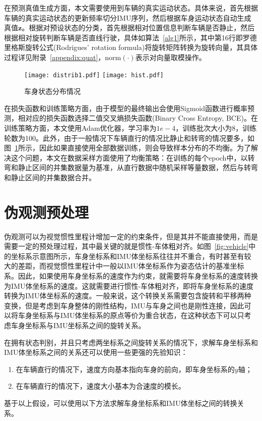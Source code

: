 在预测真值生成方面，本文需要使用到车辆的真实运动状态。具体来说，首先根据车辆的真实运动状态的更新频率切分IMU序列，然后根据车身运动状态自动生成真值$\symbf{z}$。根据对预设状态的分类，首先根据相对位置信息判断车辆是否静止，然后根据相对旋转判断车辆是否直线行驶，具体如算法~\ref{alg1}所示，其中第16行即罗德里格斯旋转公式(Rodrigues' rotation formula)\cite{dai2015euler}将旋转矩阵转换为旋转向量，其具体过程详见附录~\ref{appendix:quat}，$\text{norm}(\cdot)$表示对向量取模操作。

\begin{figure}
  \centering
  \texttt{[image: distrib1.pdf]}
  \texttt{[image: hist.pdf]}
  \caption{车身状态分布情况}
  \label{fig:data_distrib}
\end{figure}

在损失函数和训练策略方面，由于模型的最终输出会使用Sigmoid函数进行概率预测，相对应的损失函数选择二值交叉熵损失函数(Binary Cross Entropy, BCE)。在训练策略方面，本文使用Adam优化器\cite{kingma2014adam}，学习率为$1e-4$，训练批次大小为8，训练轮数为100。此外，由于一般情况下车辆直行的情况比静止和转弯的情况要多，如图~\ref{fig:data_distrib}所示，因此如果直接使用全部数据训练，则会导致样本分布的不均衡。为了解决这个问题，本文在数据采样方面使用了均衡策略：在训练的每个epoch中，以转弯和静止区间的并集数据量为基准，从直行数据中随机采样等量数据，然后与转弯和静止区间的并集数据合并。

\section{伪观测预处理}

伪观测可以为视觉惯性里程计增加一定的约束条件，但是其并不能直接使用，而是需要一定的预处理过程，其中最关键的就是惯性-车体粗对齐。如图~\ref{fig:vehicle}中的坐标系示意图所示，车身坐标系和IMU体坐标系往往并不重合，有时甚至有较大的差距，而视觉惯性里程计中一般以IMU体坐标系作为姿态估计的基准坐标系。因此，如果使用车身坐标系的速度作为约束，就需要将车身坐标系的速度转换为IMU体坐标系的速度。这就需要进行惯性-车体粗对齐，即将车身坐标系的速度转换为IMU体坐标系的速度。一般来说，这个转换关系需要包含旋转和平移两种变换，但是考虑到车身整体的刚性结构，IMU与车身之间也是刚性连接，因此可以将车身坐标系与IMU体坐标系的原点等价为重合状态，在这种状态下可以只考虑车身坐标系与IMU坐标系之间的旋转关系。

在拥有状态判别，并且只考虑两坐标系之间旋转关系的情况下，求解车身坐标系和IMU体坐标系之间的关系还可以使用一些更强的先验知识：
\begin{enumerate}
  \item 在车辆直行的情况下，速度方向基本指向车身的前向，即车身坐标系的$y$轴；
  \item 在车辆直行的情况下，速度大小基本为合速度的模长。
\end{enumerate}
基于以上假设，可以使用以下方法求解车身坐标系和IMU体坐标之间的转换关系。


